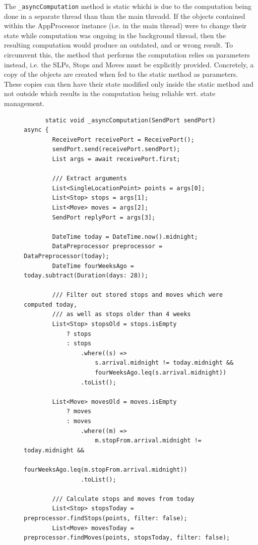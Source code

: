 The \verb|_asyncComputation| method is static whichi is due to the computation being done in a separate thread than than the main threadd. If the objects contained within the AppProcessor instance (i.e. in the main thread) were to change their state while computation was ongoing in the background thread, then the resulting computation would produce an outdated, and or wrong result. To circumvent this, the method that performs the computation relies on parameters instead, i.e. the SLPs, Stops and Moves must be explicitly provided. Concretely, a copy of the objects are created when fed to the static method as parameters. These copies can then have their state modified only inside the static method and not outside which results in the computation being reliable wrt. state management. 

\begin{figure}
    \centering
    \begin{verbatim}
      static void _asyncComputation(SendPort sendPort) async {
        ReceivePort receivePort = ReceivePort();
        sendPort.send(receivePort.sendPort);
        List args = await receivePort.first;
    
        /// Extract arguments
        List<SingleLocationPoint> points = args[0];
        List<Stop> stops = args[1];
        List<Move> moves = args[2];
        SendPort replyPort = args[3];
    
        DateTime today = DateTime.now().midnight;
        DataPreprocessor preprocessor = DataPreprocessor(today);
        DateTime fourWeeksAgo = today.subtract(Duration(days: 28));
    
        /// Filter out stored stops and moves which were computed today,
        /// as well as stops older than 4 weeks
        List<Stop> stopsOld = stops.isEmpty
            ? stops
            : stops
                .where((s) =>
                    s.arrival.midnight != today.midnight &&
                    fourWeeksAgo.leq(s.arrival.midnight))
                .toList();
    
        List<Move> movesOld = moves.isEmpty
            ? moves
            : moves
                .where((m) =>
                    m.stopFrom.arrival.midnight != today.midnight &&
                    fourWeeksAgo.leq(m.stopFrom.arrival.midnight))
                .toList();
    
        /// Calculate stops and moves from today
        List<Stop> stopsToday = preprocessor.findStops(points, filter: false);
        List<Move> movesToday = preprocessor.findMoves(points, stopsToday, filter: false);
    

\end{verbatim}
\end{figure}
